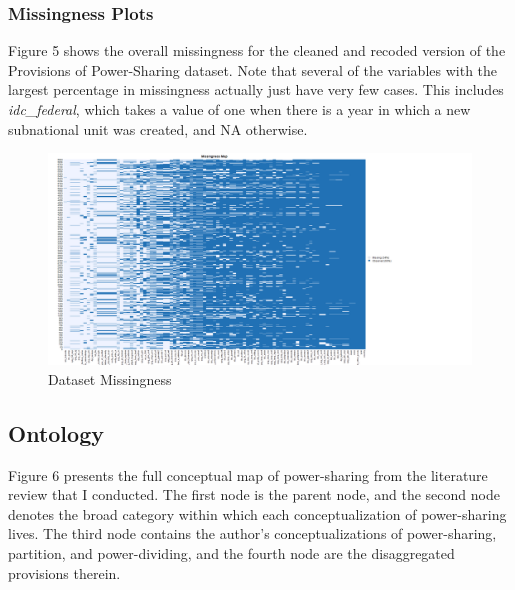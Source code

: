 \documentclass[12pt]{article}
\begin{document}
\subsubsection{Missingness Plots}

Figure 5 shows the overall missingness for the cleaned and recoded version of the Provisions of Power-Sharing dataset. Note that several of the variables with the largest percentage in missingness actually just have very few cases. This includes \textit{idc\_federal}, which takes a value of one when there is a year in which a new subnational unit was created, and NA otherwise. 

\begin{figure}[!htbp]
	\begin{center}
		\includegraphics[width = 8in]{tjbrailey_psp_clean_missingness.png}
	\end{center}
	\caption{Dataset Missingness}
\end{figure}

\subsection{Ontology}

Figure 6 presents the full conceptual map of power-sharing from the literature review that I conducted. The first node is the parent node, and the second node denotes the broad category within which each conceptualization of power-sharing lives. The third node contains the author's conceptualizations of power-sharing, partition, and power-dividing, and the fourth node are the disaggregated provisions therein. 
\end{document}
